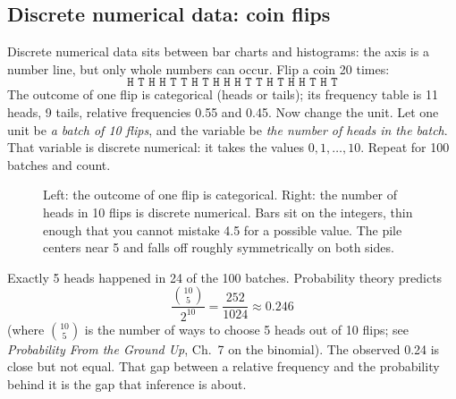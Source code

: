 \subsection{Discrete numerical data: coin flips}

Discrete numerical data sits between bar charts and histograms: the axis is a number line,
but only whole numbers can occur. Flip a coin 20 times:
\[
\texttt{H T H H T T H T H H H T T H T H H T H T}
\]
The outcome of one flip is categorical (heads or tails); its frequency table is 11 heads,
9 tails, relative frequencies 0.55 and 0.45. Now change the unit. Let one unit be \emph{a
batch of 10 flips}, and the variable be \emph{the number of heads in the batch}. That variable
is discrete numerical: it takes the values $0,1,\dots,10$. Repeat for 100 batches and count.

\begin{figure}[H]
\centering
{}
\caption{Left: the outcome of one flip is categorical. Right: the number of heads in 10 flips
is discrete numerical. Bars sit on the integers, thin enough that you cannot mistake 4.5 for a
possible value. The pile centers near 5 and falls off roughly symmetrically on both sides.}
\label{fig:data-coins}
\end{figure}

Exactly 5 heads happened in 24 of the 100 batches. Probability theory predicts
\[
  \frac{\binom{10}{5}}{2^{10}} = \frac{252}{1024} \approx 0.246
\]
(where $\binom{10}{5}$ is the number of ways to choose 5 heads out of 10 flips; see \emph{Probability From the Ground Up},
Ch.~7 on the binomial). The observed 0.24 is close but not equal. That gap between a
relative frequency and the probability behind it is the gap that inference is about.

